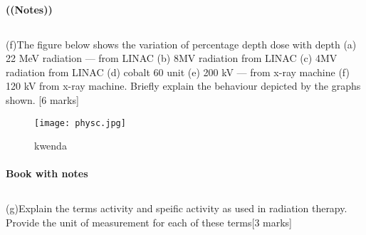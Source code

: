 \documentclass[11pt,letterpaper]{article}
\begin{document}
\paragraph{((Notes))}
\subsection*{}(f)The figure below shows the variation of percentage depth dose with depth (a) 22 MeV radiation — from LINAC (b) 8MV radiation from LINAC (c) 4MV radiation from LINAC (d)
cobalt 60 unit (e) 200 kV — from x-ray machine (f) 120 kV from x-ray machine. Briefly explain the behaviour depicted by the graphs shown. [6 marks]
\begin{figure}[htp]
    \centering
    \texttt{[image: physc.jpg]}
    \caption{kwenda}
    \label{fig:galaxy}
\end{figure}
\paragraph{Book with notes}


\subsection*{}(g)Explain the terms activity and speific activity as used in radiation therapy. Provide the unit of measurement for each of these terms[3 marks]
\end{document}
